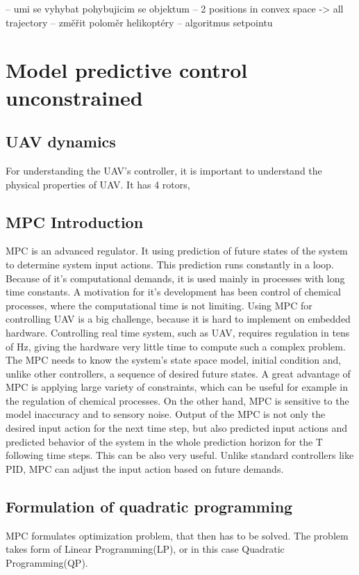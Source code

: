 \documentclass{article}
\begin{document}
-- umi se vyhybat pohybujicim se objektum
-- 2 positions in convex space -> all trajectory
-- změřit poloměr helikoptéry
-- algoritmus setpointu

\section{Model predictive control unconstrained}

\subsection{UAV dynamics}
For understanding the UAV's controller, it is important to understand the physical properties of UAV. It has 4 rotors, 


\subsection{MPC Introduction}
MPC is an advanced regulator. It using prediction of future states of the system to determine system input actions. This prediction runs constantly in a loop. Because of it's computational demands, it is used mainly in processes with long time constants. A motivation for it's development has been control of chemical processes, where the computational time is not limiting. Using MPC for controlling UAV is a big challenge, because it is hard to implement on embedded hardware. Controlling real time system, such as UAV, requires regulation in tens of Hz, giving the hardware very little time to compute such a complex problem.
The MPC needs to know the system's state space model, initial condition and, unlike other controllers, a sequence of desired future states. A great advantage of MPC is applying large variety of constraints, which can be useful for example in the regulation of chemical processes. On the other hand, MPC is sensitive to the model inaccuracy and to sensory noise. Output of the MPC is not only the desired input action for the next time step, but also predicted input actions and predicted behavior of the system in the whole prediction horizon for the T following time steps. This can be also very useful. Unlike standard controllers like PID, MPC can adjust the input action based on future demands.

\subsection{Formulation of quadratic programming}
MPC formulates optimization problem, that then has to be solved. The problem takes form of Linear Programming(LP), or in this case Quadratic Programming(QP). 
\end{document}
